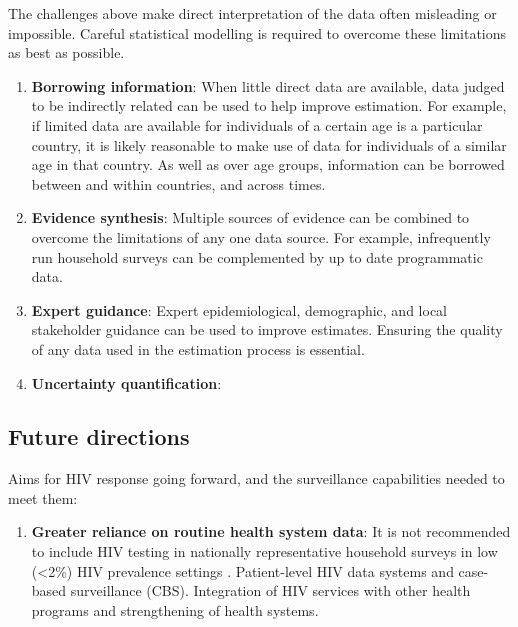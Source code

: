 \documentclass[a4paper, nobind]{templates/ociamthesis}
\providecommand{\tightlist}{%
  \setlength{\itemsep}{0pt}\setlength{\parskip}{0pt}}
\begin{document}
The challenges above make direct interpretation of the data often misleading or impossible.
Careful statistical modelling is required to overcome these limitations as best as possible.

\begin{enumerate}
\def\labelenumi{\arabic{enumi}.}
\tightlist
\item
  \textbf{Borrowing information}:
  When little direct data are available, data judged to be indirectly related can be used to help improve estimation.
  For example, if limited data are available for individuals of a certain age is a particular country, it is likely reasonable to make use of data for individuals of a similar age in that country.
  As well as over age groups, information can be borrowed between and within countries, and across times.
\item
  \textbf{Evidence synthesis}:
  Multiple sources of evidence can be combined to overcome the limitations of any one data source.
  For example, infrequently run household surveys can be complemented by up to date programmatic data.
\item
  \textbf{Expert guidance}:
  Expert epidemiological, demographic, and local stakeholder guidance can be used to improve estimates.
  Ensuring the quality of any data used in the estimation process is essential.
\item
  \textbf{Uncertainty quantification}:
\end{enumerate}

\hypertarget{future-directions}{%
\subsection{Future directions}\label{future-directions}}

Aims for HIV response going forward, and the surveillance capabilities needed to meet them:

\begin{enumerate}
\def\labelenumi{\arabic{enumi}.}
\tightlist
\item
  \textbf{Greater reliance on routine health system data}:
  It is not recommended to include HIV testing in nationally representative household surveys in low (\textless2\%) HIV prevalence settings \autocite{world2005guidelines}. Patient-level HIV data systems \autocite{world2017consolidated} and case-based surveillance (CBS). Integration of HIV services with other health programs and strengthening of health systems.
\end{enumerate}
\end{document}
